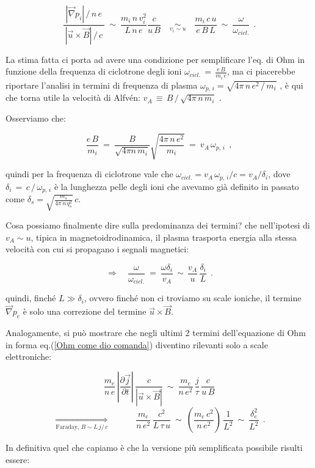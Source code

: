 \[ \frac{\ |\vec\nabla p_i|\,/\, n\,e\ }{\ |\vec u\times \vec B|\,/\,c\ }\ \sim\ \frac{m_i\, n\, v_i^2}{L\, n\, e}\frac{c}{u\, B}\quad \underset{v_i\sim u}{\sim}\quad \frac{m_i\, c\, u}{e\, B\, L}\ \sim \ \frac{\omega}{\omega_{cicl.}}\ \ . \]

La stima fatta ci porta ad avere una condizione per semplificare l'eq. di Ohm in funzione della frequenza di ciclotrone degli ioni $\omega_{cicl.}\,=\,\frac{e\, B}{m_i\, c}$, ma ci piacerebbe riportare l'analisi in termini di frequenza di plasma $\omega_{p,\, i}= \sqrt{4\pi\, n\, e^2\, /\, m_i}$ , è qui che torna utile la velocità di Alfvén: $v_A\,\equiv\, B\, /\, \sqrt{4\pi\, n\, m_i}$ .

Osserviamo che:

\[\frac{e\, B}{m_i}\ =\ \frac{B}{\sqrt{4\pi n\, m_i}} \sqrt{\frac{4\pi \, n\, e^2}{m_i}}\ =\ v_A\, \omega_{p,\, i}\ \ ,\]

quindi per la frequenza di ciclotrone vale che 
$\omega_{cicl.} = v_A\, \omega_{p,\, i}/c = v_A/\delta_i$, dove $\delta_i\, =\, c\, /\, \omega_{p,\, i}$ è la lunghezza pelle degli ioni che avevamo già definito in passato come $\delta_s = \displaystyle\sqrt{\frac{m_s}{4\pi\, n\, q_s^2}}\, c$.

Cosa possiamo finalmente dire sulla predominanza dei termini? che nell'ipotesi di $v_A\sim u$, tipica in magnetoidrodinamica, il plasma trasporta energia alla stessa velocità con cui si propagano i segnali magnetici:

\[\Rightarrow \quad \frac{\omega}{\omega_{cicl.}}\ =\ \frac{\omega \delta_i}{v_A}\, \sim\, \frac{v_A}{u}\, \frac{\delta_i}{L}\ \ .\]

quindi, finché $L\gg \delta_i$, ovvero finché non ci troviamo su scale ioniche, il termine $\vec \nabla p_e$ è solo una correzione del termine $\vec u\times \vec B$.

Analogamente, si può mostrare che negli ultimi 2 termini dell'equazione di Ohm in forma eq.(\ref{Ohm come dio comanda}) diventino rilevanti solo a scale elettroniche:

\[ \frac{m_e}{n\, e}\, \left| \frac{\partial \vec j}{\partial t} \right|\, \frac{c}{|\vec u\times \vec B|}\ \sim\ \frac{m_e}{n\, e^2}\, \frac{j}{\tau}\, \frac{c}{u\, B} \]
\[ \underset{\text{Faraday, } B\sim L\,j/\,c}{\Rightarrow} \quad \quad \quad \frac{m_e}{n\, e^2}\, \frac{c^2}{L\, \tau\, u}\ \sim\ \left(\frac{m_e\, c^2}{n\,e^2}\right)\, \frac{1}{L^2}\ \sim\ \frac{\delta_e^2}{L^2}\ \ .\]

In definitiva quel che capiamo è che la versione più semplificata possibile risulti essere:

